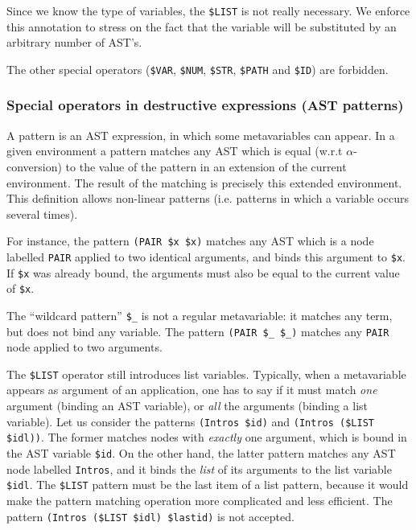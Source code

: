 {%
Since we know the type of variables, the \verb+$LIST+
is not really
necessary. We enforce this annotation to stress on the fact that the
variable will be substituted by an arbitrary number of AST's.

The other special operators ({\tt\$VAR}, {\tt\$NUM}, {\tt\$STR},
{\tt\$PATH} and {\tt\$ID}) are forbidden.

\subsubsection{Special operators in destructive expressions (AST patterns)}
\label{patternsyntax}


A pattern is an AST expression, in which some metavariables can
appear. In a given environment a pattern matches any AST which is
equal (w.r.t $\alpha$-conversion) to the value of the pattern in an
extension of the current environment. The result of the matching is
precisely this extended environment. This definition allows
non-linear patterns (i.e. patterns in which a variable occurs several
times).

For instance, the pattern \verb+(PAIR $x $x)+ matches any AST which is
a node labelled {\tt PAIR} applied to two identical arguments, and
binds this argument to {\tt\$x}. If {\tt\$x} was already bound, the
arguments must also be equal to the current value of {\tt\$x}.

The ``wildcard pattern'' \verb+$_+ is not a regular metavariable: it
matches any term, but does not bind any variable. The pattern
\verb+(PAIR $_ $_)+ matches any {\tt PAIR} node applied to two
arguments.

The {\tt\$LIST} operator still introduces list variables. Typically,
when a metavariable appears as argument of an application, one has to
say if it must match \emph{one} argument (binding an AST variable), or
\emph{all} the arguments (binding a list variable). Let us consider
the patterns \verb+(Intros $id)+ and \verb+(Intros ($LIST $idl))+. The
former matches nodes with \emph{exactly} one argument, which is bound
in the AST variable {\tt\$id}. On the other hand, the latter pattern
matches any AST node labelled {\tt Intros}, and it binds the
\emph{list} of its arguments to the list variable {\tt\$idl}. The
{\tt\$LIST} pattern must be the last item of a list pattern, because
it would make the pattern matching operation more complicated and less
efficient. The pattern \verb+(Intros ($LIST $idl) $lastid)+ is not
accepted.

}
